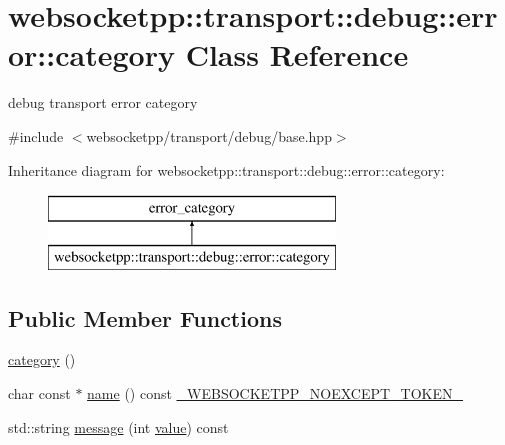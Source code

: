 \hypertarget{classwebsocketpp_1_1transport_1_1debug_1_1error_1_1category}{}\section{websocketpp\+:\+:transport\+:\+:debug\+:\+:error\+:\+:category Class Reference}
\label{classwebsocketpp_1_1transport_1_1debug_1_1error_1_1category}


debug transport error category  




{\ttfamily \#include $<$websocketpp/transport/debug/base.\+hpp$>$}

Inheritance diagram for websocketpp\+:\+:transport\+:\+:debug\+:\+:error\+:\+:category\+:\begin{figure}[H]
\begin{center}
\leavevmode
\includegraphics[height=2.000000cm]{classwebsocketpp_1_1transport_1_1debug_1_1error_1_1category}
\end{center}
\end{figure}
\subsection*{Public Member Functions}
\begin{DoxyCompactItemize}
\item 
\hyperlink{classwebsocketpp_1_1transport_1_1debug_1_1error_1_1category_a11a0d735342c3f45ee519171d3c507cd}{category} ()
\item 
char const $\ast$ \hyperlink{classwebsocketpp_1_1transport_1_1debug_1_1error_1_1category_a19f55b05a90e1e825a4caabd86f8ce90}{name} () const \hyperlink{boost__config_8hpp_aa19747404a5f2fe9c9eb9e9d2e48f26c}{\+\_\+\+W\+E\+B\+S\+O\+C\+K\+E\+T\+P\+P\+\_\+\+N\+O\+E\+X\+C\+E\+P\+T\+\_\+\+T\+O\+K\+E\+N\+\_\+}
\item 
std\+::string \hyperlink{classwebsocketpp_1_1transport_1_1debug_1_1error_1_1category_a5e527f744880e4bb1befa21ca8fee6e8}{message} (int \hyperlink{namespacewebsocketpp_1_1transport_1_1debug_1_1error_a5ee6badaa3c5ebb600c4062394fac69c}{value}) const 
\end{DoxyCompactItemize}


